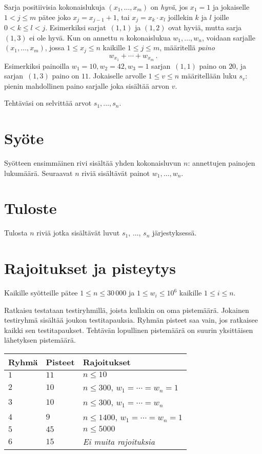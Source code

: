 
\noindent
Sarja positiivisia kokonaislukuja $(x_1,\ldots,x_m)$ on \emph{hyvä}, jos 
$x_1 = 1$ ja jokaiselle $1 < j \leq m$ pätee joko 
$x_j=x_{j-1}+1$, tai $x_j=x_k\cdot x_l$ joillekin $k$ ja $l$ joille 
$0< k\leq l< j$.
Esimerkiksi sarjat~$(1,1)$ ja $(1,2)$ ovat hyviä, mutta sarja~$(1,3)$ ei ole hyvä.
Kun on annettu $n$ kokonaislukua $w_1,\ldots,w_n$, voidaan sarjalle
$(x_1,\ldots,x_m)$, jossa $1\leq x_j \leq n$ kaikille $1\leq j\leq m$, 
määritellä \emph{paino}  
\[ w_{x_1} +\cdots +w_{x_m}\,.\]
Esimerkiksi painoilla $w_1=10, w_2=42,w_3= 1$ sarjan~$(1,1)$ paino on $20$, ja 
sarjan~$(1,3)$ paino on $11$. 
Jokaiselle arvolle $1\leq v\leq n$ määritellään luku $s_v$: pienin mahdollinen paino 
sarjalle joka sisältää arvon $v$.

Tehtäväsi on selvittää arvot $s_1,\ldots, s_n$.

\section*{Syöte}

Syötteen ensimmäinen rivi sisältää yhden kokonaisluvun $n$: annettujen painojen lukumäärä.
Seuraavat $n$ riviä sisältävät painot $w_1, \ldots, w_n$.

\section*{Tuloste}

Tulosta $n$ riviä jotka sisältävät luvut $s_1$, $\ldots$, $s_n$ järjestyksessä.

\section*{Rajoitukset ja pisteytys}

Kaikille syötteille pätee
$1\leq n \leq 30\,000$ %
ja
$1\leq w_i \leq 10^6$ kaikille $1\leq i \leq n$.%


Ratkaisu testataan testiryhmillä, joista kullakin on oma pistemäärä.
Jokainen testiryhmä sisältää joukon testitapauksia.
Ryhmän pisteet saa vain, jos ratkaisee kaikki sen testitapaukset.
Tehtävän lopullinen pistemäärä on suurin yksittäisen lähetyksen pistemäärä.

\medskip
\begin{tabular}{lll}
Ryhmä & Pisteet & Rajoitukset \\\hline
$1$   & $11$ & $n\leq 10$ \\
$2$   & $10$ & $n\leq 300$, $w_1=\cdots=w_n = 1$ \\
$3$   & $10$ & $n\leq 300$, $w_1=\cdots=w_n$ \\ %
$4$   & $9$ & $n\leq 1400$, $w_1=\cdots=w_n = 1$ \\
$5$   & $45$ & $n\leq 5000$\\
$6$   & $15$ & \emph{Ei muita rajoituksia}
\end{tabular}
